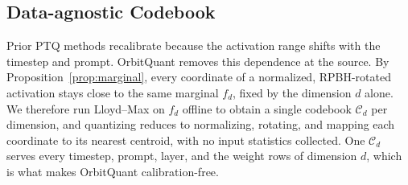 


\subsection{Data-agnostic Codebook}
\label{sec:method:codebook}
Prior PTQ methods recalibrate because the activation range shifts with the timestep and prompt. OrbitQuant removes this dependence at the source. By Proposition~\ref{prop:marginal}, every coordinate of a normalized, RPBH-rotated activation stays close to the same marginal $f_d$, fixed by the dimension $d$ alone. We therefore run Lloyd--Max on $f_d$ offline to obtain a single codebook $\mathcal{C}_d$ per dimension, and quantizing reduces to normalizing, rotating, and mapping each coordinate to its nearest centroid, with no input statistics collected. One $\mathcal{C}_d$ serves every timestep, prompt, layer, and the weight rows of dimension $d$, which is what makes OrbitQuant calibration-free.

